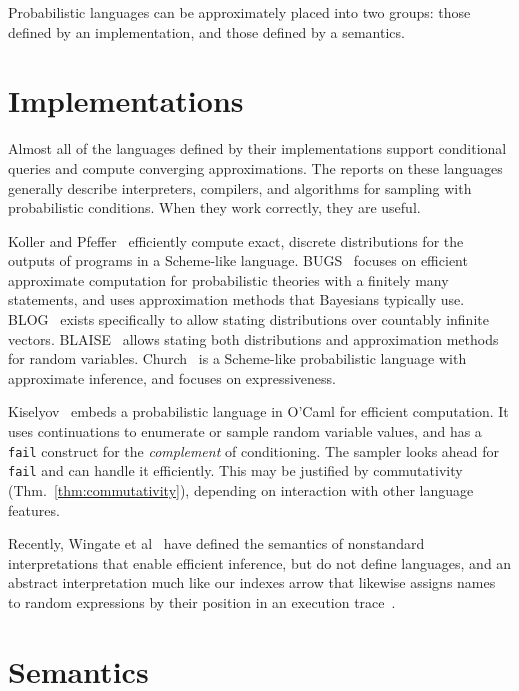 Probabilistic languages can be approximately placed into two groups: those defined by an implementation, and those defined by a semantics.

\section{Implementations}

Almost all of the languages defined by their implementations support conditional queries and compute converging approximations.
The reports on these languages generally describe interpreters, compilers, and algorithms for sampling with probabilistic conditions.
When they work correctly, they are useful.

Koller and Pfeffer~\cite{cit:koller-1997aaai-bayes-programs-short} efficiently compute exact, discrete distributions for the outputs of programs in a Scheme-like language.
BUGS~\cite{cit:winbugs-language-short} focuses on efficient approximate computation for probabilistic theories with a finitely many statements, and uses approximation methods that Bayesians typically use.
BLOG~\cite{cit:blog-language-short} exists specifically to allow stating distributions over countably infinite vectors.
BLAISE~\cite{cit:blaise-language} allows stating both distributions and approximation methods for random variables.
Church~\cite{cit:church-language-short} is a Scheme-like probabilistic language with approximate inference, and focuses on expressiveness.

Kiselyov~\cite{cit:kiselyov-2008uai-monolingual} embeds a probabilistic language in O'Caml for efficient computation.
It uses continuations to enumerate or sample random variable values, and has a \texttt{fail} construct for the \textit{complement} of conditioning.
The sampler looks ahead for \texttt{fail} and can handle it efficiently.
This may be justified by commutativity (Thm.~\ref{thm:commutativity}), depending on interaction with other language features.

Recently, Wingate et al~\cite{cit:wingate-2011nips-nonstandard} have defined the semantics of nonstandard interpretations that enable efficient inference, but do not define languages, and an abstract interpretation much like our indexes arrow that likewise assigns names to random expressions by their position in an execution trace~\cite{cit:wingate-2011ais-lightweight}.

\section{Semantics}


